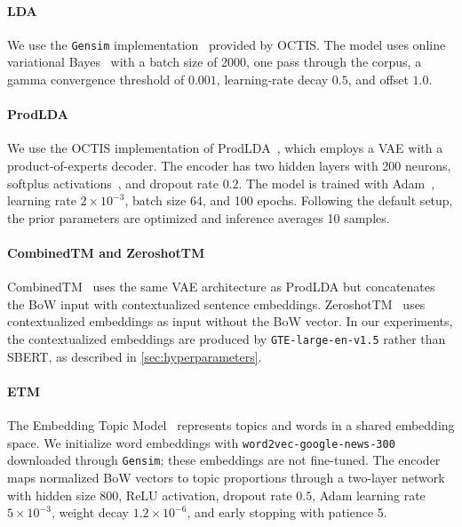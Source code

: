 \documentclass{article}
\theoremstyle{plain}
\theoremstyle{definition}
\theoremstyle{remark}
\begin{document}
\paragraph{LDA}
We use the \texttt{Gensim} implementation~\citep{rehurek2010-gensim} provided by OCTIS. The model uses online variational Bayes~\citep{hoffman2010online} with a batch size of 2000, one pass through the corpus, a gamma convergence threshold of $0.001$, learning-rate decay $0.5$, and offset $1.0$.

\paragraph{ProdLDA}
We use the OCTIS implementation of ProdLDA~\citep{srivastava2017autoencoding}, which employs a VAE with a product-of-experts decoder. The encoder has two hidden layers with 200 neurons, softplus activations~\citep{zheng2015improving}, and dropout rate $0.2$. The model is trained with Adam~\citep{kingma2014adam}, learning rate $2\times 10^{-3}$, batch size 64, and 100 epochs. Following the default setup, the prior parameters are optimized and inference averages 10 samples.

\paragraph{CombinedTM and ZeroshotTM}
CombinedTM~\citep{bianchi-etal-2021-pre} uses the same VAE architecture as ProdLDA but concatenates the BoW input with contextualized sentence embeddings. ZeroshotTM~\citep{bianchi-etal-2021-cross} uses contextualized embeddings as input without the BoW vector. In our experiments, the contextualized embeddings are produced by \texttt{GTE-large-en-v1.5} rather than SBERT, as described in \autoref{sec:hyperparameters}.

\paragraph{ETM}
The Embedding Topic Model~\citep{dieng-etal-2020-topic} represents topics and words in a shared embedding space. We initialize word embeddings with \texttt{word2vec-google-news-300}~\citep{mikolov2013distributed} downloaded through \texttt{Gensim}; these embeddings are not fine-tuned. The encoder maps normalized BoW vectors to topic proportions through a two-layer network with hidden size 800, ReLU activation, dropout rate $0.5$, Adam learning rate $5\times10^{-3}$, weight decay $1.2\times10^{-6}$, and early stopping with patience 5.
\end{document}
